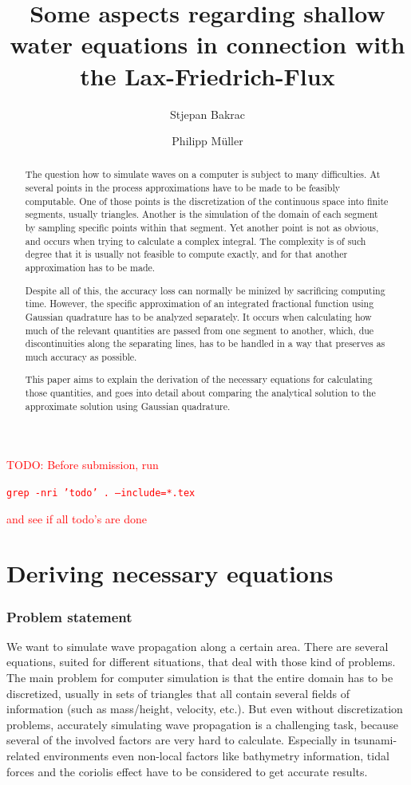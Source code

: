 \documentclass{article}
\title{Some aspects regarding shallow water equations in connection with the Lax-Friedrich-Flux}
\author{Stjepan Bakrac \and Philipp M\"uller}
\date{}
\newcommand{\todo}[1]{\textcolor{red}{TODO: #1}}
\begin{document}
\maketitle{}

\todo{Before submission, run
  \begin{center}
    \texttt{grep -nri 'todo' . --include=*.tex}
  \end{center}
and see if all todo's are done}

\begin{abstract}
  The question how to simulate waves on a computer is subject to many difficulties. At several points in the process approximations have to be made to be feasibly computable. One of those points is the discretization of the continuous space into finite segments, usually triangles. Another is the simulation of the domain of each segment by sampling specific points within that segment. Yet another point is not as obvious, and occurs when trying to calculate a complex integral. The complexity is of such degree that it is usually not feasible to compute exactly, and for that another approximation has to be made.

  Despite all of this, the accuracy loss can normally be minized by sacrificing computing time. However, the specific approximation of an integrated fractional function using Gaussian quadrature has to be analyzed separately. It occurs when calculating how much of the relevant quantities are passed from one segment to another, which, due discontinuities along the separating lines, has to be handled in a way that preserves as much accuracy as possible.

  This paper aims to explain the derivation of the necessary equations for calculating those quantities, and goes into detail about comparing the analytical solution to the approximate solution using Gaussian quadrature.
\end{abstract}

\part{Deriving necessary equations}
\label{part:introduction}

\section{Problem statement}
\label{sec:problem-statement}

We want to simulate wave propagation along a certain area. There are several equations, suited for different situations, that deal with those kind of problems. The main problem for computer simulation is that the entire domain has to be discretized, usually in sets of triangles that all contain several fields of information (such as mass/height, velocity, etc.). But even without discretization problems, accurately simulating wave propagation is a challenging task, because several of the involved factors are very hard to calculate. Especially in tsunami-related environments even non-local factors like bathymetry information, tidal forces and the coriolis effect have to be considered to get accurate results.
\end{document}
